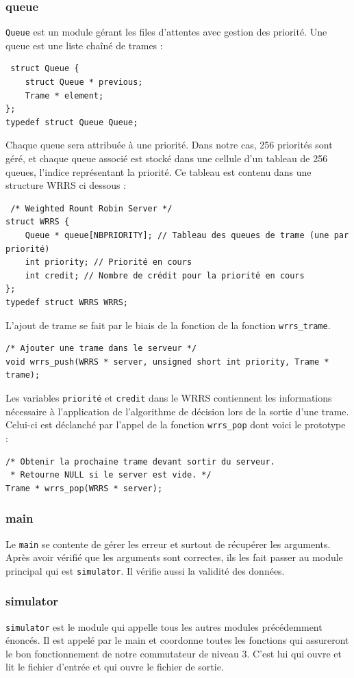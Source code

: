 \documentclass[a4paper,11pt]{article}
\begin{document}
\subsubsection{queue}
\texttt{Queue} est un module gérant les files d'attentes avec gestion
des priorité. Une queue est une liste chaîné de trames :
\begin{verbatim}
 struct Queue {
    struct Queue * previous;
    Trame * element;
};
typedef struct Queue Queue;
\end{verbatim}
Chaque queue sera attribuée à une priorité. Dans notre cas, 256 priorités
sont géré, et chaque queue associé est stocké dans une cellule d'un
tableau de 256 queues, l'indice représentant la priorité.
Ce tableau est contenu dans une structure WRRS ci dessous :
\begin{verbatim}
 /* Weighted Rount Robin Server */
struct WRRS {
    Queue * queue[NBPRIORITY]; // Tableau des queues de trame (une par priorité)
    int priority; // Priorité en cours
    int credit; // Nombre de crédit pour la priorité en cours
};
typedef struct WRRS WRRS;
\end{verbatim}
L'ajout de trame se fait par le biais de la fonction de la fonction
\texttt{wrrs\_trame}.
\begin{verbatim}
/* Ajouter une trame dans le serveur */
void wrrs_push(WRRS * server, unsigned short int priority, Trame * trame);
\end{verbatim}
Les variables \texttt{priorité} et \texttt{credit} dans le WRRS
contiennent les informations nécessaire à l'application de l'algorithme
de décision lors de la sortie d'une trame. Celui-ci est déclanché par
l'appel de la fonction \texttt{wrrs\_pop} dont voici le prototype :
\begin{verbatim}
/* Obtenir la prochaine trame devant sortir du serveur.
 * Retourne NULL si le server est vide. */
Trame * wrrs_pop(WRRS * server);
\end{verbatim}

\subsubsection{main}
Le \texttt{main} se contente de gérer les erreur et surtout de récupérer les arguments. Après avoir vérifié que les arguments sont correctes, ils les fait passer au module principal qui est \texttt{simulator}. Il vérifie aussi la validité des données.

\subsubsection{simulator}
\texttt{simulator} est le module qui appelle tous les autres modules précédemment énoncés. Il est appelé par le main et coordonne toutes les fonctions qui assureront le bon fonctionnement de notre commutateur de niveau 3. C'est lui qui ouvre et lit le fichier d'entrée et qui ouvre le fichier de sortie.
\end{document}
